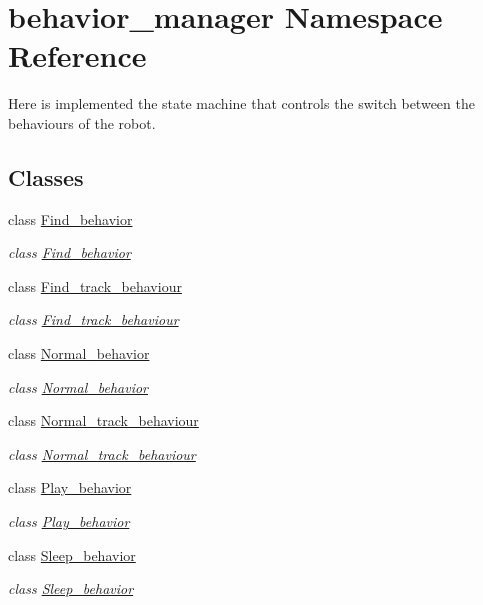 \hypertarget{namespacebehavior__manager}{}\section{behavior\+\_\+manager Namespace Reference}
\label{namespacebehavior__manager}


Here is implemented the state machine that controls the switch between the behaviours of the robot.  


\subsection*{Classes}
\begin{DoxyCompactItemize}
\item 
class \hyperlink{classbehavior__manager_1_1Find__behavior}{Find\+\_\+behavior}
\begin{DoxyCompactList}\small\item\em class \hyperlink{classbehavior__manager_1_1Find__behavior}{Find\+\_\+behavior} \end{DoxyCompactList}\item 
class \hyperlink{classbehavior__manager_1_1Find__track__behaviour}{Find\+\_\+track\+\_\+behaviour}
\begin{DoxyCompactList}\small\item\em class \hyperlink{classbehavior__manager_1_1Find__track__behaviour}{Find\+\_\+track\+\_\+behaviour} \end{DoxyCompactList}\item 
class \hyperlink{classbehavior__manager_1_1Normal__behavior}{Normal\+\_\+behavior}
\begin{DoxyCompactList}\small\item\em class \hyperlink{classbehavior__manager_1_1Normal__behavior}{Normal\+\_\+behavior} \end{DoxyCompactList}\item 
class \hyperlink{classbehavior__manager_1_1Normal__track__behaviour}{Normal\+\_\+track\+\_\+behaviour}
\begin{DoxyCompactList}\small\item\em class \hyperlink{classbehavior__manager_1_1Normal__track__behaviour}{Normal\+\_\+track\+\_\+behaviour} \end{DoxyCompactList}\item 
class \hyperlink{classbehavior__manager_1_1Play__behavior}{Play\+\_\+behavior}
\begin{DoxyCompactList}\small\item\em class \hyperlink{classbehavior__manager_1_1Play__behavior}{Play\+\_\+behavior} \end{DoxyCompactList}\item 
class \hyperlink{classbehavior__manager_1_1Sleep__behavior}{Sleep\+\_\+behavior}
\begin{DoxyCompactList}\small\item\em class \hyperlink{classbehavior__manager_1_1Sleep__behavior}{Sleep\+\_\+behavior} \end{DoxyCompactList}\end{DoxyCompactItemize}
